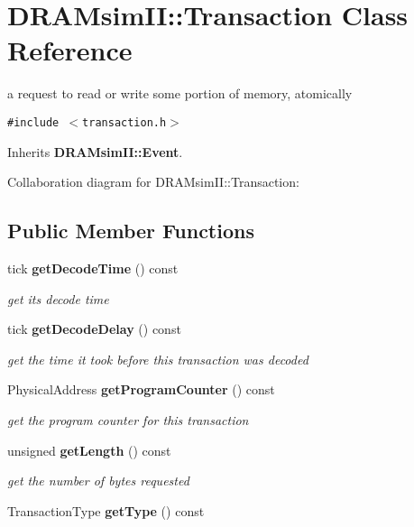 \section{DRAMsimII::Transaction Class Reference}
\label{class_d_r_a_msim_i_i_1_1_transaction}
a request to read or write some portion of memory, atomically  


{\tt \#include $<$transaction.h$>$}

Inherits {\bf DRAMsimII::Event}.

Collaboration diagram for DRAMsimII::Transaction:\subsection*{Public Member Functions}
\begin{CompactItemize}
\item 
tick {\bf getDecodeTime} () const \label{class_d_r_a_msim_i_i_1_1_transaction_6f3ffd616ea2ac0a57c00c870c3ed7c7}

\begin{CompactList}\small\item\em get its decode time \item\end{CompactList}\item 
tick {\bf getDecodeDelay} () const \label{class_d_r_a_msim_i_i_1_1_transaction_9150a5afae5893e9ccd1b05b396aeea0}

\begin{CompactList}\small\item\em get the time it took before this transaction was decoded \item\end{CompactList}\item 
PhysicalAddress {\bf getProgramCounter} () const \label{class_d_r_a_msim_i_i_1_1_transaction_4062ffc918d35c057ebc6b03fe0be3ba}

\begin{CompactList}\small\item\em get the program counter for this transaction \item\end{CompactList}\item 
unsigned {\bf getLength} () const \label{class_d_r_a_msim_i_i_1_1_transaction_92b4de22f19d5d659f236f40f442801d}

\begin{CompactList}\small\item\em get the number of bytes requested \item\end{CompactList}\item 
TransactionType {\bf getType} () const \label{class_d_r_a_msim_i_i_1_1_transaction_f8a03aa94ca2d4e196d54c5ca46d0e1a}


\end{CompactItemize}
